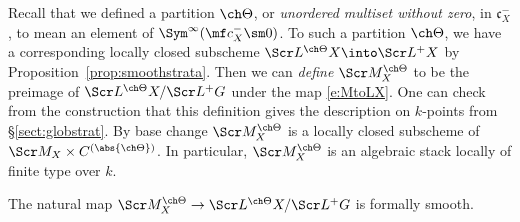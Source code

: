 Recall that we defined a partition $\ch\Theta$, or \emph{unordered multiset without zero}, in $\mathfrak c_X^-$,
to mean an element of $\Sym^\infty(\mf c_X^- \sm 0)$.
To such a partition $\ch\Theta$, we have a corresponding
locally closed subscheme $\Scr L^{\ch\Theta} X \into \Scr L^+ X$
by Proposition~\ref{prop:smoothstrata}.
Then we can \emph{define} $\Scr M^{\ch\Theta}_X$
to be the preimage of $\Scr L^{\ch\Theta} X / \Scr L^+G$ under the map
\eqref{e:MtoLX}.
One can check from the construction that
this definition gives the description on $k$-points
from \S\ref{sect:globstrat}.
By base change $\Scr M^{\ch\Theta}_X$ is a locally closed
subscheme of $\Scr M_X \times C^{(\abs{\ch\Theta})}$.
In particular, $\Scr M^{\ch\Theta}_X$ is an algebraic
stack locally of finite type over $k$.

\begin{lem}
\notready \label{lem:MtoLsm}
The natural map $\Scr M^{\ch\Theta}_X \to \Scr L^{\ch\Theta} X / \Scr L^+G$ is formally
smooth.
\end{lem}
